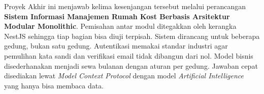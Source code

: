 Proyek Akhir ini menjawab kelima kesenjangan tersebut melalui perancangan \textbf{Sistem Informasi Manajemen Rumah Kost Berbasis Arsitektur Modular Monolithic}. Pemisahan antar modul ditegakkan oleh kerangka NestJS sehingga tiap bagian bisa diuji terpisah. Sistem dirancang untuk beberapa gedung, bukan satu gedung. Autentikasi memakai standar industri agar pemulihan kata sandi dan verifikasi email tidak dibangun dari nol. Model bisnis disederhanakan menjadi sewa bulanan dengan aturan per gedung. Jawaban cepat disediakan lewat \textit{Model Context Protocol} dengan model \textit{Artificial Intelligence} yang hanya bisa membaca data.
